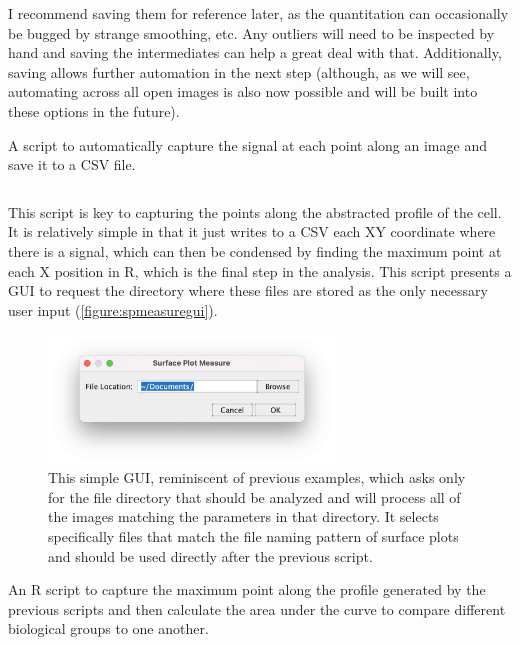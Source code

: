 I recommend saving them for reference later, as the quantitation can occasionally be bugged by strange smoothing, etc. Any outliers will need to be inspected by hand and saving the intermediates can help a great deal with that. Additionally, saving allows further automation in the next step (although, as we will see, automating across all open images is also now possible and will be built into these options in the future).

\begin{code}
\caption{A script to automatically capture the signal at each point along an image and save it to a CSV file.}
\label{surfaceplot}

\inputminted[breaklines,frame=single,fontsize=\small]{python}{source/autoSurfacePlotMeasure.py}

\end{code}

This script is key to capturing the points along the abstracted profile of the cell. It is relatively simple in that it just writes to a CSV each XY coordinate where there is a signal, which can then be condensed by finding the maximum point at each X position in R, which is the final step in the analysis. This script presents a GUI to request the directory where these files are stored as the only necessary user input (\autoref{figure:spmeasuregui}).

\begin{figure}
\centering
\includegraphics[width=3in]{images/spmeasuregui.png}
\caption[GUI for measuring the output from ``3D Surface Plot'']{This simple GUI, reminiscent of previous examples, which asks only for the file directory that should be analyzed and will process all of the images matching the parameters in that directory. It selects specifically files that match the file naming pattern of surface plots and should be used directly after the previous script.}
\label{figure:spmeasuregui}
\end{figure}

\begin{code}
\caption{An R script to capture the maximum point along the profile generated by the previous scripts and then calculate the area under the curve to compare different biological groups to one another.}
\label{blinder}

\inputminted[breaklines,frame=single,fontsize=\small]{r}{source/surface_plot_analysis.R}

\end{code}

